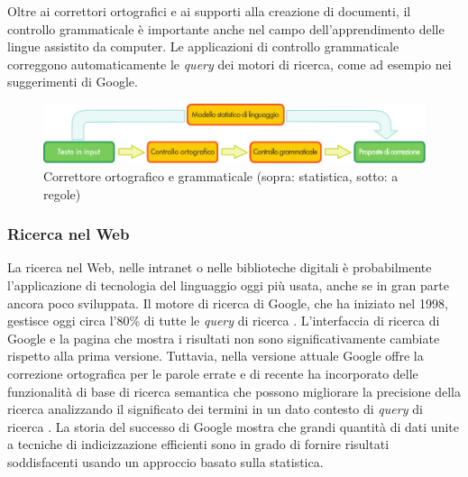 \begin{multicols}{2}

Oltre ai correttori ortografici e ai supporti alla creazione di documenti, il controllo grammaticale \`{e} importante anche nel campo dell'apprendimento delle lingue assistito da computer. Le applicazioni di controllo grammaticale correggono automaticamente le \emph{query} dei motori di ricerca, come ad esempio nei suggerimenti di Google.

%
\begin{figure}[htb]
  \center
  \includegraphics[width=\textwidth]{../_media/italian/language_checking}
  \caption{Correttore ortografico e grammaticale (sopra: statistica, sotto: a regole)}
  \label{fig:langcheckingaarch_de}
\end{figure}

\subsubsection{Ricerca nel Web}

La ricerca nel Web, nelle intranet o nelle biblioteche digitali \`{e} probabilmente l'applicazione di tecnologia del linguaggio oggi pi\`{u} usata, anche se  in gran parte ancora poco sviluppata. Il motore di ricerca di Google, che ha iniziato nel 1998, gestisce oggi circa l'80\% di tutte le \emph{query} di ricerca \cite{spi1}. L'interfaccia di ricerca di Google e la pagina che mostra i risultati non sono significativamente cambiate rispetto alla prima versione. Tuttavia, nella versione attuale Google offre la correzione ortografica per le parole errate e di recente ha incorporato delle funzionalit\`{a} di base di ricerca semantica che possono migliorare la precisione della ricerca analizzando il significato dei termini in un dato contesto di \emph{query} di ricerca \cite{pc1}. La storia del successo di Google mostra che grandi quantit\`{a} di dati unite a tecniche di indicizzazione efficienti sono in grado di fornire risultati soddisfacenti usando un approccio basato sulla statistica.


\end{multicols}
